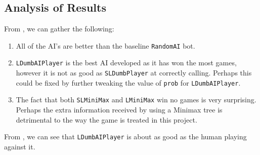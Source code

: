 \subsection{Analysis of Results}

From , we can gather the following:
\begin{enumerate}
    \item All of the AI's are better than the baseline \texttt{RandomAI} bot.
    \item \texttt{LDumbAIPlayer} is the best AI developed as it has won the most games, however it is not as good as \texttt{SLDumbPlayer} at correctly calling. Perhaps this could be fixed by further tweaking the value of \texttt{prob} for \texttt{LDumbAIPlayer}.
    \item The fact that both \texttt{SLMiniMax} and \texttt{LMiniMax} win no games is very surprising. Perhaps the extra information received by using a Minimax tree is detrimental to the way the game is treated in this project.
\end{enumerate}

From , we can see that \texttt{LDumbAIPlayer} is about as good as the human playing against it.
